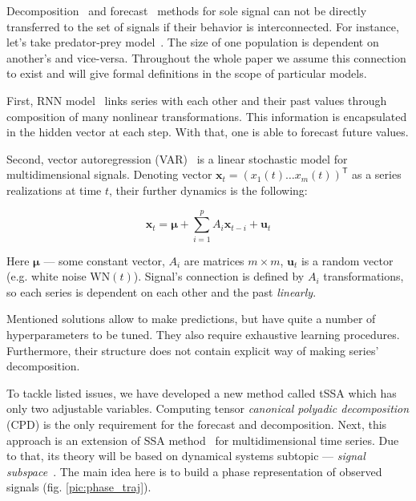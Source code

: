 	Decomposition~\cite{enders2010applied, x11, cleveland90} and forecast~\cite{3b1355aedd1041f1853e609a410576f3, enders2010applied, Box_Jenkins_methodology} methods for sole signal can not be directly transferred to the set of signals if their behavior is interconnected. For instance, let's take predator-prey model~\cite{Volterra:1928}. The size of one population is dependent on another's and vice-versa. Throughout the whole paper we assume this connection to exist and will give formal definitions in the scope of particular models. 
	
	First, RNN model~\cite{neco, TEALAB2018334} links series with each other and their past values through composition of many nonlinear transformations. This information is encapsulated in the hidden vector at each step. With that, one is able to forecast future values.
	
	Second, vector autoregression (VAR)~\cite{VAR_model1, doi:10.1080/01621459.1962.10480664} is a linear stochastic model for multidimensional signals. Denoting vector $ \mathbf{x}_t = (x_1(t) \ldots x_m(t))^{\mathsf{T}} $ as a series realizations at time $ t $, their further dynamics is the following:
	
	\begin{equation*}
		\mathbf{x}_t = \boldsymbol{\mu} + \sum\limits_{i = 1}^p A_i \mathbf{x}_{t - i} + \mathbf{u}_t
	\end{equation*}
	
	Here  $ \boldsymbol{\mu} $ --- some constant vector, $ A_i $ are matrices $ m \times m $, $ \mathbf{u}_t $ is a random vector (e.g. white noise $ \text{WN}(t) $). Signal's connection is defined by $ A_i $ transformations, so each series is dependent on each other and the past \textit{linearly}.
	
	Mentioned solutions allow to make predictions, but have quite a number of hyperparameters to be tuned. They also require exhaustive learning procedures. Furthermore, their structure does not contain explicit way of making series' decomposition.
	
	To tackle listed issues, we have developed a new method called tSSA which has only two adjustable variables. Computing tensor \emph{canonical polyadic decomposition} (CPD) is the only requirement for the forecast and decomposition. Next, this approach is an extension of SSA method~\cite{ecfb9dc578be43ae9ee8fc88b8ff9151} for multidimensional time series. Due to that, its theory will be based on dynamical systems subtopic --- \textit{signal subspace}~\cite{1572261550523548160}. The main idea here is to build a phase representation of observed signals (fig. \ref{pic:phase_traj}).
	
